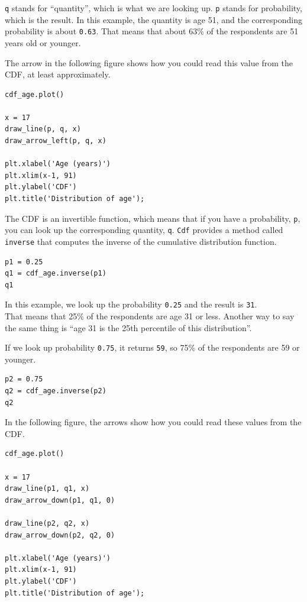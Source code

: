 \passthrough{\lstinline!q!} stands for ``quantity'', which is what we
are looking up. \passthrough{\lstinline!p!} stands for probability,
which is the result. In this example, the quantity is age 51, and the
corresponding probability is about \passthrough{\lstinline!0.63!}. That
means that about 63\% of the respondents are 51 years old or younger.

The arrow in the following figure shows how you could read this value
from the CDF, at least approximately.

\begin{lstlisting}[]
cdf_age.plot()

x = 17
draw_line(p, q, x)
draw_arrow_left(p, q, x)

plt.xlabel('Age (years)')
plt.xlim(x-1, 91)
plt.ylabel('CDF')
plt.title('Distribution of age');
\end{lstlisting}

The CDF is an invertible function, which means that if you have a
probability, \passthrough{\lstinline!p!}, you can look up the
corresponding quantity, \passthrough{\lstinline!q!}.
\passthrough{\lstinline!Cdf!} provides a method called
\passthrough{\lstinline!inverse!} that computes the inverse of the
cumulative distribution function.

\begin{lstlisting}[]
p1 = 0.25
q1 = cdf_age.inverse(p1)
q1
\end{lstlisting}

In this example, we look up the probability
\passthrough{\lstinline!0.25!} and the result is
\passthrough{\lstinline!31!}.\\
That means that 25\% of the respondents are age 31 or less. Another way
to say the same thing is ``age 31 is the 25th percentile of this
distribution''.

If we look up probability \passthrough{\lstinline!0.75!}, it returns
\passthrough{\lstinline!59!}, so 75\% of the respondents are 59 or
younger.

\begin{lstlisting}[]
p2 = 0.75
q2 = cdf_age.inverse(p2)
q2
\end{lstlisting}

In the following figure, the arrows show how you could read these values
from the CDF.

\begin{lstlisting}[]
cdf_age.plot()

x = 17
draw_line(p1, q1, x)
draw_arrow_down(p1, q1, 0)

draw_line(p2, q2, x)
draw_arrow_down(p2, q2, 0)

plt.xlabel('Age (years)')
plt.xlim(x-1, 91)
plt.ylabel('CDF')
plt.title('Distribution of age');
\end{lstlisting}

